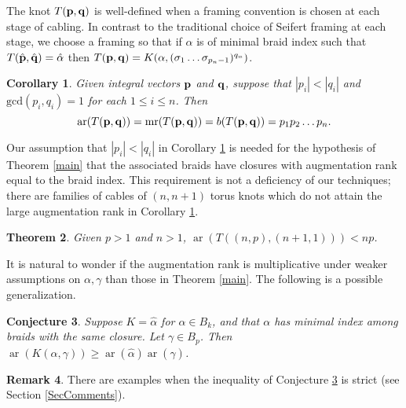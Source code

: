 \documentclass[11pt]{amsart}
\def\s{{\sigma}}
\def\ar{\operatorname{ar}}
\def\mr{\operatorname{mr}}
\def\fp{{\scriptstyle \bar{\bar{p}}}}
\newtheorem{thm}{Theorem}[section]
\newtheorem{cor}[thm]{Corollary}
\newtheorem{conj}[thm]{Conjecture}
\theoremstyle{definition}
\newtheorem{rem}[thm]{Remark}
\begin{document}
The knot $T({\bf p},{\bf q})$ is well-defined when a framing convention is chosen at each stage of cabling. In contrast to the traditional choice of Seifert framing at each stage, we choose a framing so that if $\alpha$ is of minimal braid index such that $T(\hat{\bf p},\hat{\bf q}) = \hat{\alpha}$ then $T({\bf p},{\bf q}) = K(\alpha,(\s_1\ldots\s_{p_n-1})^{q_n})$.

\begin{cor}\label{cor:iteratedCables}
Given integral vectors ${\bf p}$ and ${\bf q}$, suppose that $|p_i|<|q_i|$ and $\text{gcd}(p_i,q_i)=1$ for each $1\le i\le n$. Then 
      \[\ar(T({\bf p},{\bf q}))=\mr(T({\bf p},{\bf q})) = b(T({\bf p},{\bf q}))=p_1p_2\ldots p_n.\]
\end{cor}

Our assumption that $|p_i|<|q_i|$ in Corollary \ref{cor:iteratedCables} is needed for the hypothesis of Theorem \ref{main} that the associated braids have closures with augmentation rank equal to the braid index. This requirement is not a deficiency of our techniques; there are families of cables of $(n,n+1)$ torus knots which do not attain the large augmentation rank in Corollary \ref{cor:iteratedCables}.

\begin{thm}\label{ThmNNPlus1}Given $p>1$ and $n>1$, $\ar(T((n,p),(n+1,1))) < np$.
\end{thm}

It is natural to wonder if the augmentation rank is multiplicative under weaker assumptions on $\alpha, \gamma$ than those in Theorem \ref{main}. The following is a possible generalization.

\begin{conj}Suppose $K=\hat{\alpha}$ for $\alpha\in B_k$, and that $\alpha$ has minimal index among braids with the same closure. Let $\gamma\in B_p$. Then $\ar(K(\alpha,\gamma)) \ge \ar(\hat{\alpha})\ar(\hat{\gamma})$.
\label{ConjSuperMultipl}
\end{conj}

\begin{rem}There are examples when the inequality of Conjecture \ref{ConjSuperMultipl} is strict (see Section \ref{SecComments}).
\label{RemStrictlySuper}
\end{rem}

\end{document}
